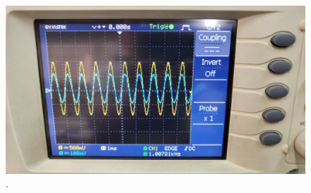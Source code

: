 \documentclass[11pt]{article}
\begin{document}
\begin{question}
\begin{subquestion}
{\begin{figure}[H]
                \includegraphics[scale=0.1,angle=0]{Fig/21.jpeg}
                \caption{.}
            \end{figure}
        }
    \end{subquestion}


\end{question}
\end{document}
